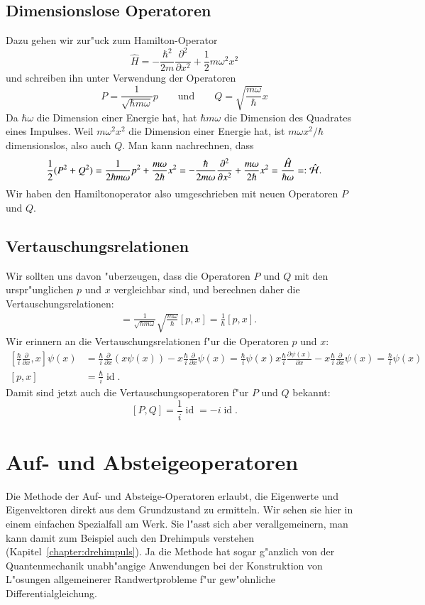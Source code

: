 \subsection{Dimensionslose Operatoren}
Dazu gehen wir zur"uck zum Hamilton-Operator
\[
\hat H=-\frac{\hbar^2}{2m}\frac{\partial^2}{\partial x^2}
+\frac12m\omega^2 x^2
\]
und schreiben ihn unter Verwendung der Operatoren
\[
P=\frac{1}{\sqrt{\hbar m\omega}}p 
\qquad
\text{und}
\qquad
Q=\sqrt{\frac{m\omega}{\hbar}}x
\]
Da $\hbar\omega$ die Dimension einer Energie hat, hat $\hbar m\omega$ die
Dimension des Quadrates eines Impulses. Weil $m\omega^2x^2$ die Dimension
einer Energie hat, ist $m\omega x^2/\hbar$ dimensionslos, also auch
$Q$.
Man kann nachrechnen, dass 
\[
\frac12(P^2+Q^2)
=
\frac{1}{2\hbar m \omega}p^2
+
\frac{m\omega}{2\hbar}x^2
=
-\frac{\hbar}{2 m \omega}\frac{\partial^2}{\partial x^2}
+
\frac{m\omega}{2\hbar}x^2
=\frac{\hat H}{\hbar\omega}
=:\hat{\cal H}.
\]
Wir haben den Hamiltonoperator also umgeschrieben mit neuen Operatoren 
$P$ und $Q$.

\subsection{Vertauschungsrelationen}
Wir sollten uns davon "uberzeugen, dass die Operatoren $P$ und $Q$ 
mit den urspr"unglichen $p$ und $x$ vergleichbar sind, und berechnen
daher die Vertauschungsrelationen:
\begin{align*}
[P,Q]
&=
\frac{1}{\sqrt{\hbar m\omega}} \sqrt{\frac{m\omega}{\hbar}}[p, x]
=
\frac1{\hbar}[p,x].
\end{align*}
Wir erinnern an die Vertauschungsrelationen f"ur die Operatoren $p$ und $x$:
\begin{align*}
\left[\frac{\hbar}{i}\frac{\partial}{\partial x}, x\right]\psi(x)
&=
\frac{\hbar}{i}\frac{\partial}{\partial x}(x\psi(x))
-x\frac{\hbar}{i}\frac{\partial}{\partial x}\psi(x)
=
\frac{\hbar}{i}\psi(x)
x\frac{\hbar}{i}\frac{\partial \psi(x)}{\partial x}
-x\frac{\hbar}{i}\frac{\partial}{\partial x}\psi(x)
=\frac{\hbar}{i}\psi(x)
\\
[p,x]&=\frac{\hbar}{i}\operatorname{id}.
\end{align*}
Damit sind jetzt auch die Vertauschungsoperatoren f"ur $P$ und $Q$ 
bekannt:
\[
[P,Q]=\frac1{i}\operatorname{id}=-i\operatorname{id}.
\]

\section{Auf- und Absteigeoperatoren}
Die Methode der Auf- und Absteige-Operatoren erlaubt, die Eigenwerte
und Eigenvektoren direkt aus dem Grundzustand zu ermitteln.
Wir sehen sie hier in einem einfachen Spezialfall am Werk.
Sie l"asst sich aber verallgemeinern, man kann damit zum Beispiel
auch den Drehimpuls verstehen (Kapitel~\ref{chapter:drehimpuls}).
Ja die Methode hat sogar g"anzlich von der Quantenmechanik unabh"angige
Anwendungen bei der Konstruktion von L"osungen allgemeinerer Randwertprobleme
f"ur gew"ohnliche Differentialgleichung.

